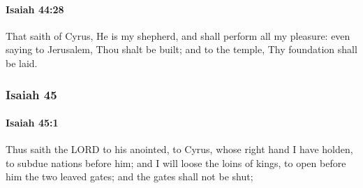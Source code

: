 		\paragraph{Isaiah 44:28} %
			\label{ISAIAH-44-28}

			That saith of Cyrus, He is my shepherd, and shall perform all my pleasure: even saying to Jerusalem, Thou shalt be built; and to the temple, Thy foundation shall be laid.

	\subsubsection{Isaiah 45} %
		\label{ISAIAH-45}

		\paragraph{Isaiah 45:1} %
			\label{ISAIAH-45-1}

			Thus saith the LORD to his anointed, to Cyrus, whose right hand I have holden, to subdue nations before him; and I will loose the loins of kings, to open before him the two leaved gates; and the gates shall not be shut;

